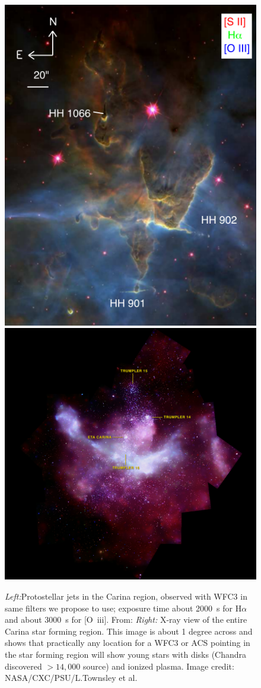 \documentclass[12pt]{article}
\begin{document}
\begin{figure}
    \centering
    \includegraphics[width=.45\textwidth]{reiter13_fig3.png}
    \includegraphics[width=.54\textwidth]{carina_xray_label.jpg}
    \caption{\emph{Left:}Protostellar jets in the Carina region, observed with WFC3 in same filters we propose to use; exposure time about 2000~s for H$\alpha$ and about 3000~s for [O~{\sc iii}]. From: \citet{2013MNRAS.433.2226R} \emph{Right:} X-ray view of the entire Carina star forming region. This image is about 1 degree across and shows that practically any location for a WFC3 or ACS pointing in the star forming region will show young stars with disks (Chandra discovered $> 14,000$ source) and ionized plasma. Image credit: NASA/CXC/PSU/L.Townsley et al.}
    \label{fig:reiter}
\end{figure}
\end{document}
